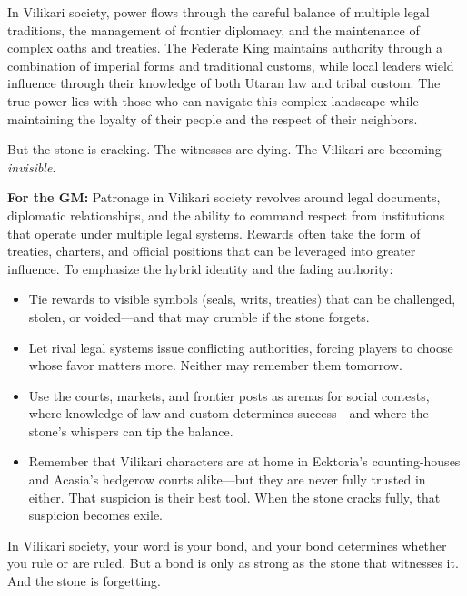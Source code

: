 \begin{tcolorbox}[colback=black!3,colframe=black!40!white,title={Patronage \& Power},breakable]
In Vilikari society, power flows through the careful balance of multiple legal traditions, the management of frontier diplomacy, and the maintenance of complex oaths and treaties. The Federate King maintains authority through a combination of imperial forms and traditional customs, while local leaders wield influence through their knowledge of both Utaran law and tribal custom. The true power lies with those who can navigate this complex landscape while maintaining the loyalty of their people and the respect of their neighbors.

But the stone is cracking. The witnesses are dying. The Vilikari are becoming \emph{invisible}.

\textbf{For the GM:}  
Patronage in Vilikari society revolves around legal documents, diplomatic relationships, and the ability to command respect from institutions that operate under multiple legal systems. Rewards often take the form of treaties, charters, and official positions that can be leveraged into greater influence. To emphasize the hybrid identity and the fading authority:
\begin{itemize}[nosep]
  \item Tie rewards to visible symbols (seals, writs, treaties) that can be challenged, stolen, or voided---and that may crumble if the stone forgets.
  \item Let rival legal systems issue conflicting authorities, forcing players to choose whose favor matters more. Neither may remember them tomorrow.
  \item Use the courts, markets, and frontier posts as arenas for social contests, where knowledge of law and custom determines success---and where the stone's whispers can tip the balance.
  \item Remember that Vilikari characters are at home in Ecktoria's counting-houses and Acasia's hedgerow courts alike---but they are never fully trusted in either. That suspicion is their best tool. When the stone cracks fully, that suspicion becomes exile.
\end{itemize}
In Vilikari society, your word is your bond, and your bond determines whether you rule or are ruled. But a bond is only as strong as the stone that witnesses it. And the stone is forgetting.
\end{tcolorbox}

